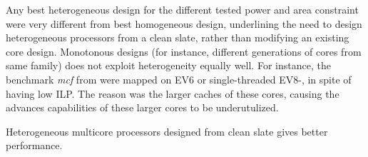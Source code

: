 Any best heterogeneous design for the different tested power and area constraint were very different from best homogeneous design, underlining the need to design heterogeneous processors from a clean slate, rather than modifying an existing core design.
Monotonous designs (for instance, different generations of cores from same family) does not exploit heterogeneity equally well.
For instance, the benchmark \textit{mcf} from \cite{heterogeneous-ee} were mapped on EV6 or single-threaded EV8-, in spite of having low ILP.
The reason was the larger caches of these cores, causing the advances capabilities of these larger cores to be underutulized.

Heterogeneous multicore processors designed from clean slate gives better performance.






